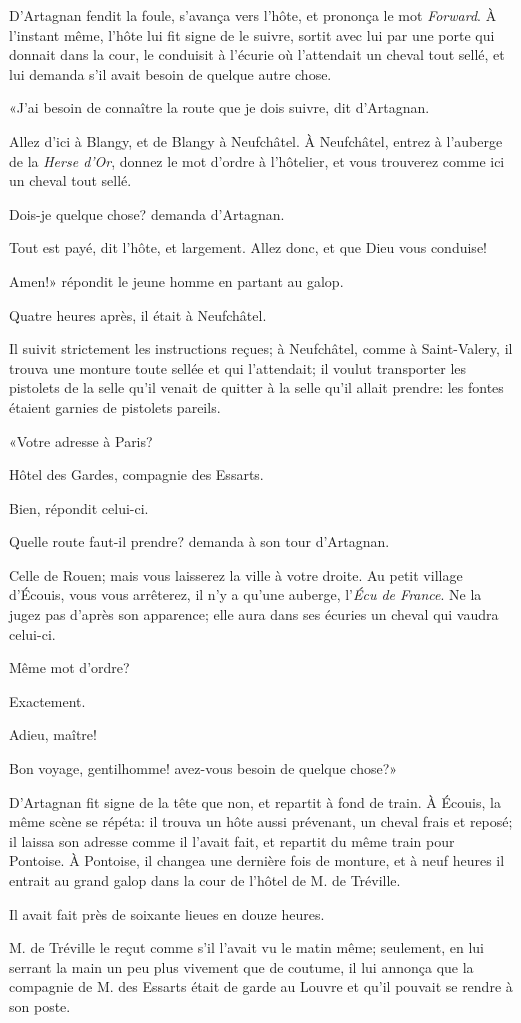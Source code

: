 D'Artagnan fendit la foule, s'avança vers l'hôte, et prononça le mot \textit{Forward}. À l'instant même, l'hôte lui fit signe de le suivre, sortit avec lui par une porte qui donnait dans la cour, le conduisit à l'écurie où l'attendait un cheval tout sellé, et lui demanda s'il avait besoin de quelque autre chose. 

«J'ai besoin de connaître la route que je dois suivre, dit d'Artagnan. 

\speak  Allez d'ici à Blangy, et de Blangy à Neufchâtel. À Neufchâtel, entrez à l'auberge de la \textit{Herse d'Or}, donnez le mot d'ordre à l'hôtelier, et vous trouverez comme ici un cheval tout sellé. 

\speak  Dois-je quelque chose? demanda d'Artagnan. 

\speak  Tout est payé, dit l'hôte, et largement. Allez donc, et que Dieu vous conduise! 

\speak  Amen!» répondit le jeune homme en partant au galop. 

Quatre heures après, il était à Neufchâtel. 

Il suivit strictement les instructions reçues; à Neufchâtel, comme à Saint-Valery, il trouva une monture toute sellée et qui l'attendait; il voulut transporter les pistolets de la selle qu'il venait de quitter à la selle qu'il allait prendre: les fontes étaient garnies de pistolets pareils. 

«Votre adresse à Paris? 

\speak  Hôtel des Gardes, compagnie des Essarts. 

\speak  Bien, répondit celui-ci. 

\speak  Quelle route faut-il prendre? demanda à son tour d'Artagnan. 

\speak  Celle de Rouen; mais vous laisserez la ville à votre droite. Au petit village d'Écouis, vous vous arrêterez, il n'y a qu'une auberge, l'\textit{Écu de France}. Ne la jugez pas d'après son apparence; elle aura dans ses écuries un cheval qui vaudra celui-ci. 

\speak  Même mot d'ordre? 

\speak  Exactement. 

\speak  Adieu, maître! 

\speak  Bon voyage, gentilhomme! avez-vous besoin de quelque chose?» 

D'Artagnan fit signe de la tête que non, et repartit à fond de train. À Écouis, la même scène se répéta: il trouva un hôte aussi prévenant, un cheval frais et reposé; il laissa son adresse comme il l'avait fait, et repartit du même train pour Pontoise. À Pontoise, il changea une dernière fois de monture, et à neuf heures il entrait au grand galop dans la cour de l'hôtel de M. de Tréville. 

Il avait fait près de soixante lieues en douze heures. 

M. de Tréville le reçut comme s'il l'avait vu le matin même; seulement, en lui serrant la main un peu plus vivement que de coutume, il lui annonça que la compagnie de M. des Essarts était de garde au Louvre et qu'il pouvait se rendre à son poste.